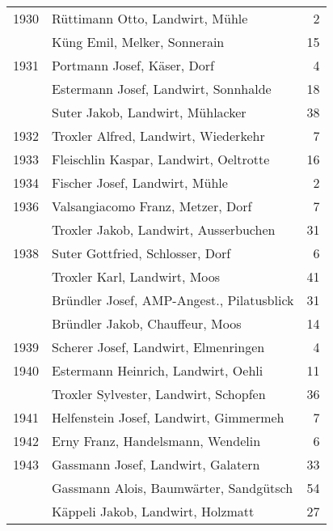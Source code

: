 {\begin{longtable}{ l l r }
        1930          & Rüttimann Otto, Landwirt, Mühle           & 2           \\
                      & Küng Emil, Melker, Sonnerain              & 15          \\
        1931          & Portmann Josef, Käser, Dorf               & 4           \\
                      & Estermann Josef, Landwirt, Sonnhalde      & 18          \\
                      & Suter Jakob, Landwirt, Mühlacker          & 38          \\
        1932          & Troxler Alfred, Landwirt, Wiederkehr      & 7           \\
        1933          & Fleischlin Kaspar, Landwirt, Oeltrotte    & 16          \\
        1934          & Fischer Josef, Landwirt, Mühle            & 2           \\
        1936          & Valsangiacomo Franz, Metzer, Dorf         & 7           \\
                      & Troxler Jakob, Landwirt, Ausserbuchen     & 31          \\
        1938          & Suter Gottfried, Schlosser, Dorf          & 6           \\
                      & Troxler Karl, Landwirt, Moos              & 41          \\
                      & Bründler Josef, AMP-Angest., Pilatusblick & 31          \\
                      & Bründler Jakob, Chauffeur, Moos           & 14          \\
        1939          & Scherer Josef, Landwirt, Elmenringen      & 4           \\
        1940          & Estermann Heinrich, Landwirt, Oehli       & 11          \\
                      & Troxler Sylvester, Landwirt, Schopfen     & 36          \\
        1941          & Helfenstein Josef, Landwirt, Gimmermeh    & 7           \\
        1942          & Erny Franz, Handelsmann, Wendelin         & 6           \\
        1943          & Gassmann Josef, Landwirt, Galatern        & 33          \\
                      & Gassmann Alois, Baumwärter, Sandgütsch    & 54          \\
                      & Käppeli Jakob, Landwirt, Holzmatt         & 27          \\

\end{longtable}}
